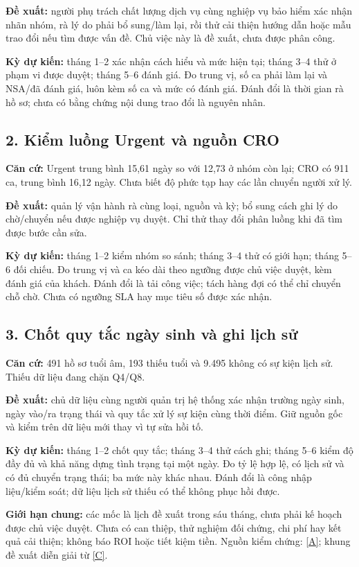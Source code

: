 \documentclass[11pt,a4paper]{article}
\newcommand{\evidence}[1]{{\small\color{muted}Nguồn kiểm chứng: #1.}\par}
\newcommand{\src}[2]{\hyperlink{source-index}{[#2]}}
\begin{document}
\textbf{Đề xuất:} người phụ trách chất lượng dịch vụ cùng nghiệp vụ bảo hiểm xác nhận nhãn nhóm, rà lý do phải bổ sung/làm lại, rồi thử cải thiện hướng dẫn hoặc mẫu trao đổi nếu tìm được vấn đề. Chủ việc này là đề xuất, chưa được phân công.

\textbf{Kỳ dự kiến:} tháng 1–2 xác nhận cách hiểu và mức hiện tại; tháng 3–4 thử ở phạm vi được duyệt; tháng 5–6 đánh giá. Đo trung vị, số ca phải làm lại và NSA/đã đánh giá, luôn kèm số ca và mức có đánh giá. Đánh đổi là thời gian rà hồ sơ; chưa có bằng chứng nội dung trao đổi là nguyên nhân.

\subsection*{2. Kiểm luồng Urgent và nguồn CRO}
\textbf{Căn cứ:} Urgent trung bình 15,61 ngày so với 12,73 ở nhóm còn lại; CRO có 911 ca, trung bình 16,12 ngày. Chưa biết độ phức tạp hay các lần chuyển người xử lý.

\textbf{Đề xuất:} quản lý vận hành rà cùng loại, nguồn và kỳ; bổ sung cách ghi lý do chờ/chuyển nếu được nghiệp vụ duyệt. Chỉ thử thay đổi phân luồng khi đã tìm được bước cần sửa.

\textbf{Kỳ dự kiến:} tháng 1–2 kiểm nhóm so sánh; tháng 3–4 thử có giới hạn; tháng 5–6 đối chiếu. Đo trung vị và ca kéo dài theo ngưỡng được chủ việc duyệt, kèm đánh giá của khách. Đánh đổi là tải công việc; tách hàng đợi có thể chỉ chuyển chỗ chờ. Chưa có ngưỡng SLA hay mục tiêu số được xác nhận.

\subsection*{3. Chốt quy tắc ngày sinh và ghi lịch sử}
\textbf{Căn cứ:} 491 hồ sơ tuổi âm, 193 thiếu tuổi và 9.495 không có sự kiện lịch sử. Thiếu dữ liệu đang chặn Q4/Q8.

\textbf{Đề xuất:} chủ dữ liệu cùng người quản trị hệ thống xác nhận trường ngày sinh, ngày vào/ra trạng thái và quy tắc xử lý sự kiện cùng thời điểm. Giữ nguồn gốc và kiểm trên dữ liệu mới thay vì tự sửa hồi tố.

\textbf{Kỳ dự kiến:} tháng 1–2 chốt quy tắc; tháng 3–4 thử cách ghi; tháng 5–6 kiểm độ đầy đủ và khả năng dựng tình trạng tại một ngày. Đo tỷ lệ hợp lệ, có lịch sử và có đủ chuyển trạng thái; ba mức này khác nhau. Đánh đổi là công nhập liệu/kiểm soát; dữ liệu lịch sử thiếu có thể không phục hồi được.

\textbf{Giới hạn chung:} các mốc là lịch đề xuất trong sáu tháng, chưa phải kế hoạch được chủ việc duyệt. Chưa có can thiệp, thử nghiệm đối chứng, chi phí hay kết quả cải thiện; không báo ROI hoặc tiết kiệm tiền.
\evidence{\src{source-analysis}{A}; khung đề xuất diễn giải từ \src{source-docs}{C}}
\clearpage
\end{document}
